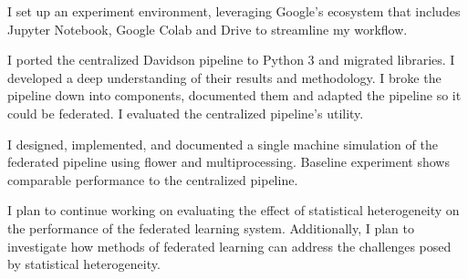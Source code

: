 \documentclass[12pt,leqno]{report}
\begin{document}
\begin{description}
I set up an experiment environment, leveraging Google’s ecosystem that includes Jupyter Notebook, Google Colab and Drive to streamline my workflow.

I ported the centralized Davidson pipeline to Python 3 and migrated libraries. I developed a deep understanding of their results and methodology. I broke the pipeline down into components, documented them and adapted the pipeline so it could be federated. I evaluated the centralized pipeline’s utility.

I designed, implemented, and documented a single machine simulation of the federated pipeline using flower and multiprocessing. Baseline experiment shows comparable performance to the centralized pipeline.

I plan to continue working on evaluating the effect of statistical heterogeneity on the performance of the federated learning system. Additionally, I plan to investigate how methods of federated learning can address the challenges posed by statistical heterogeneity.
\end{description}
\end{document}
